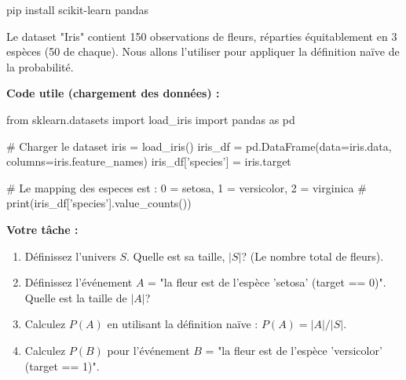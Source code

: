 \begin{codecell}
pip install scikit-learn pandas
\end{codecell}



\begin{exercicebox}
Le dataset "Iris" contient 150 observations de fleurs, réparties équitablement en 3 espèces (50 de chaque). Nous allons l'utiliser pour appliquer la définition naïve de la probabilité.

\textbf{Code utile (chargement des données) :}
\begin{codecell}
from sklearn.datasets import load_iris
import pandas as pd

# Charger le dataset
iris = load_iris()
iris_df = pd.DataFrame(data=iris.data, columns=iris.feature_names)
iris_df['species'] = iris.target

# Le mapping des especes est : 0 = setosa, 1 = versicolor, 2 = virginica
# print(iris_df['species'].value_counts())
\end{codecell}

\textbf{Votre tâche :}
\begin{enumerate}
    \item Définissez l'univers $S$. Quelle est sa taille, $|S|$? (Le nombre total de fleurs).
    \item Définissez l'événement $A$ = "la fleur est de l'espèce 'setosa' (target == 0)". Quelle est la taille de $|A|$?
    \item Calculez $P(A)$ en utilisant la définition naïve : $P(A) = |A| / |S|$.
    \item Calculez $P(B)$ pour l'événement $B$ = "la fleur est de l'espèce 'versicolor' (target == 1)".
\end{enumerate}
\end{exercicebox}



